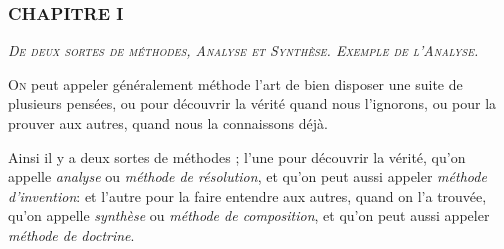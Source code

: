 \subsubsection{\centering \Large CHAPITRE I}
\begin{center}\emph{\large\scshape De deux sortes de méthodes, Analyse et Synthèse. Exemple de l'Analyse.}\end{center}

	\lettrine{O}{n} peut appeler généralement méthode l'art de bien disposer une suite de plusieurs pensées, ou pour découvrir la vérité quand nous l'ignorons, ou pour la prouver aux autres, quand nous la connaissons déjà.

Ainsi il y a deux sortes de méthodes ; l'une pour découvrir la vérité, qu'on appelle \emph{analyse} ou \emph{méthode de résolution}, et qu'on peut aussi appeler \emph{méthode d'invention}: et l'autre pour la faire entendre aux autres, quand on l'a trouvée, qu'on appelle \emph{synthèse} ou \emph{méthode de composition}, et qu'on peut aussi appeler \emph{méthode de doctrine}.

